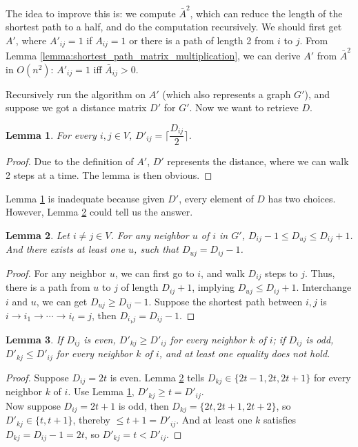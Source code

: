 \documentclass[12pt]{article}
\newtheorem{lemma}{Lemma}
\begin{document}
The idea to improve this is: we compute $\bar A^2$, which can reduce the length of the shortest path to a half, and do the computation recursively. We should first get $A'$, where $A'_{ij}=1$ if $A_{ij}=1$ or there is a path of length 2 from $i$ to $j$. From Lemma \ref{lemma:shortest_path_matrix_multiplication}, we can derive $A'$ from $\bar A^2$ in $O(n^2)$: $A'_{ij}=1$ iff $\bar A_{ij}>0$.

Recursively run the algorithm on $A'$ (which also represents a graph $G'$), and suppose we got a distance matrix $D'$ for $G'$. Now we want to retrieve $D$.

\begin{lemma}
\label{2}
For every $i,j\in V$, $D'_{ij}=\lceil\dfrac{D_{ij}}{2}\rceil$.
\end{lemma}
\begin{proof}
Due to the definition of $A'$, $D'$ represents the distance, where we can walk 2 steps at a time. The lemma is then obvious.
\end{proof}

Lemma \ref{2} is inadequate because given $D'$, every element of $D$ has two choices. However, Lemma \ref{3} could tell us the answer.
\begin{lemma}
\label{3}
Let $i\not=j \in V$. For any neighbor $u$ of $i$ in $G'$, $D_{ij}-1\le D_{uj}\le D_{ij}+1$. And there exists at least one $u$, such that $D_{uj}=D_{ij}-1$.
\end{lemma}
\begin{proof}
For any neighbor $u$, we can first go to $i$, and walk $D_{ij}$ steps to $j$. Thus, there is a path from $u$ to $j$ of length $D_{ij}+1$, implying $D_{uj}\le D_{ij}+1$. Interchange $i$ and $u$, we can get $D_{uj}\ge D_{ij}-1$. Suppose the shortest path between $i,j$ is $i\to i_1\to\cdots\to i_t=j$, then $D_{i_1j}=D_{ij}-1$.
\end{proof}

\begin{lemma}
\label{4}
If $D_{ij}$ is even, $D'_{kj}\ge D'_{ij}$ for every neighbor $k$ of $i$; if $D_{ij}$ is odd, $D'_{kj}\le D'_{ij}$ for every neighbor $k$ of $i$, and at least one equality does not hold.
\end{lemma}
\begin{proof}
Suppose $D_{ij}=2t$ is even. Lemma \ref{3} tells $D_{kj}\in\{2t-1,2t,2t+1\}$ for every neighbor $k$ of $i$. Use Lemma \ref{2}, $D'_{kj}\ge t=D'_{ij}$. \\
Now suppose $D_{ij}=2t+1$ is odd, then $D_{kj}=\{2t,2t+1,2t+2\}$, so $D'_{kj}\in \{t,t+1\}$, thereby $\le t+1=D'_{ij}$. And at least one $k$ satisfies $D_{kj}=D_{ij}-1=2t$, so $D'_{kj}=t<D'_{ij}$.
\end{proof}
\end{document}

